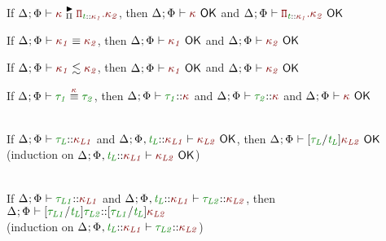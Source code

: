\documentclass[11pt]{article}
\begin{document}
    \begin{lemma}[OK-MatchPi]
        If $\MatchedPiKind{\knd}$, then $\KindWellFormed$ and $\KindWellFormed[\DepFunKind]$
    \end{lemma}
    \begin{lemma}[OK-KEquiv]
        If $\KindEquiv{\knd[1]}{\knd[2]}$, then $\KindWellFormed[{\knd[1]}]$ and $\KindWellFormed[{\knd[2]}]$
    \end{lemma}
    \begin{lemma}[OK-CSK]
        If $\ConsistentSubKind{\knd[1]}{\knd[2]}$, then $\KindWellFormed[{\knd[1]}]$ and $\KindWellFormed[{\knd[2]}]$
    \end{lemma}
    \begin{lemma}[OK-EquivAK]
        If $\TypeEquivAtKind{\typ[1]}{\typ[2]}$, then $\WellFormedAtKind{\typ[1]}$ and $\WellFormedAtKind{\typ[2]}$ and $\KindWellFormed$
    \end{lemma}
    \begin{lemma}[OK-Substitution]
        \vphantom{.}\\
        If $\WellFormedAtKind{\typ[L]}[\knd[L1]]$ and $\KindWellFormed[{\knd[L2]}][\HoleCtx\ExtendTypVarCtx[][L][{\knd[L1]}]]$, then $\KindWellFormed[\subst{\typ[L]}{\typvar[L]}{\knd[L2]}]$ \\
        (induction on $\KindWellFormed[{\knd[L2]}][\HoleCtx\ExtendTypVarCtx[][L][{\knd[L1]}]]$)
    \end{lemma}
    \begin{lemma}[K-Substitution]
        \vphantom{.}\\
        If $\WellFormedAtKind{\typ[L1]}[\knd[L1]]$ and $\WellFormedAtKind[\HoleCtx\ExtendTypVarCtx[][L][{\knd[L1]}]]{\typ[L2]}[\knd[L2]]$, then $\WellFormedAtKind{\subst{\typ[L1]}{\typvar[L]}{\typ[L2]}}[\subst{\typ[L1]}{\typvar[L]}{\knd[L2]}]$ \\
        (induction on $\WellFormedAtKind[\HoleCtx\ExtendTypVarCtx[][L][{\knd[L1]}]]{\typ[L2]}[\knd[L2]]$)
    \end{lemma}
\end{document}
